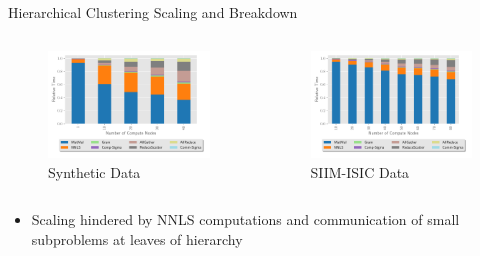 \documentclass{beamer}
\newcommand{\image}{SIIM-ISIC}
\begin{document}
\begin{frame}{Hierarchical Clustering Scaling and Breakdown}
\begin{columns}
    \end{columns}
\vspace{-.5cm}
    \begin{columns}
        \begin{column}{0.5\textwidth}
            \begin{figure}
            \includegraphics[width=\figscal]{../plots/synthetic_hier_strongscaling.pdf}
            \caption{Synthetic  Data}
            \end{figure}
        \end{column}
        \begin{column}{0.5\textwidth}
            \begin{figure}
            \includegraphics[width=\figscal]{../plots/realworld_hier_strongscaling.pdf}
            \caption{\image{} Data}
            \end{figure}
        \end{column}
    \end{columns}
    
\begin{itemize}
\small
    \item Scaling hindered by NNLS computations and communication of small subproblems at leaves of hierarchy
\end{itemize}
    
\end{frame}
\end{document}

